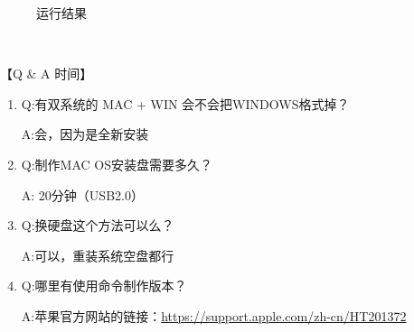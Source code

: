 \documentclass{article}
\begin{document}
\begin{enumerate}
\begin{figure}[!htb]
\caption{运行结果}
\label{tu7}
\end{figure}\\
\end{enumerate}
【Q \& A 时间】
\begin{enumerate}
\item Q:有双系统的 MAC + WIN 会不会把WINDOWS格式掉？\par
   A:会，因为是全新安装
\item Q:制作MAC OS安装盘需要多久？\par
   A:  20分钟（USB2.0）
\item Q:换硬盘这个方法可以么？\par
   A:可以，重装系统空盘都行
\item Q:哪里有使用命令制作版本？\par
   A:苹果官方网站的链接：\url{https://support.apple.com/zh-cn/HT201372}
\end{enumerate}
\end{document}

